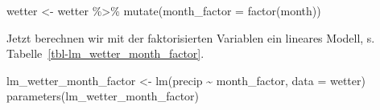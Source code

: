 \documentclass[
  a4paper,
]{scrbook}
\newenvironment{Shaded}{\begin{snugshade}}{\end{snugshade}}
\newcommand{\AttributeTok}[1]{\textcolor[rgb]{0.40,0.45,0.13}{#1}}
\newcommand{\FunctionTok}[1]{\textcolor[rgb]{0.28,0.35,0.67}{#1}}
\newcommand{\NormalTok}[1]{\textcolor[rgb]{0.00,0.23,0.31}{#1}}
\newcommand{\OtherTok}[1]{\textcolor[rgb]{0.00,0.23,0.31}{#1}}
\newcommand{\SpecialCharTok}[1]{\textcolor[rgb]{0.37,0.37,0.37}{#1}}
\theoremstyle{definition}
\theoremstyle{definition}
\theoremstyle{definition}
\theoremstyle{remark}
\begin{document}
\begin{Shaded}
\begin{Highlighting}[]
\NormalTok{wetter }\OtherTok{\textless{}{-}}
\NormalTok{  wetter }\SpecialCharTok{\%\textgreater{}\%} 
  \FunctionTok{mutate}\NormalTok{(}\AttributeTok{month\_factor =} \FunctionTok{factor}\NormalTok{(month))}
\end{Highlighting}
\end{Shaded}

Jetzt berechnen wir mit der faktorisierten Variablen ein lineares
Modell, s. Tabelle~\ref{tbl-lm_wetter_month_factor}.

\begin{Shaded}
\begin{Highlighting}[]
\NormalTok{lm\_wetter\_month\_factor }\OtherTok{\textless{}{-}} \FunctionTok{lm}\NormalTok{(precip }\SpecialCharTok{\textasciitilde{}}\NormalTok{ month\_factor, }\AttributeTok{data =}\NormalTok{ wetter)}
\FunctionTok{parameters}\NormalTok{(lm\_wetter\_month\_factor)}
\end{Highlighting}
\end{Shaded}
\end{document}
